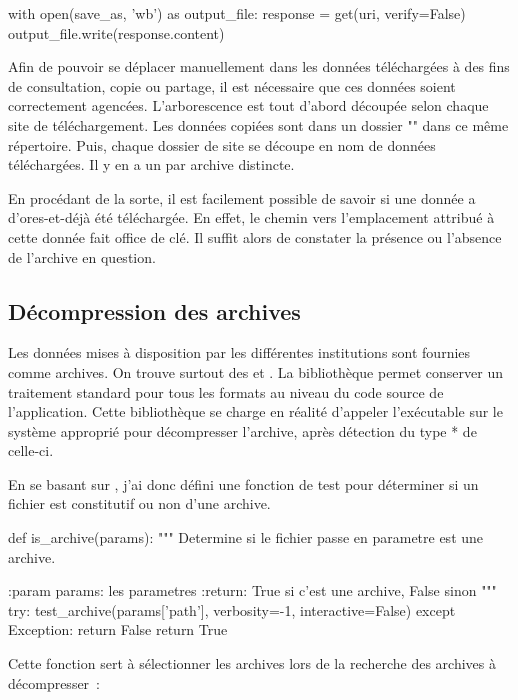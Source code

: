 \begin{Code}
  with open(save_as, 'wb') as output_file:
      response = get(uri, verify=False)
      output_file.write(response.content)
\end{Code}

Afin de pouvoir se déplacer manuellement dans les données téléchargées à des fins de consultation, copie ou partage, il est nécessaire que ces données soient correctement agencées. L'arborescence est tout d'abord découpée selon chaque site de téléchargement. Les données copiées sont dans un dossier "" dans ce même répertoire. Puis, chaque dossier de site se découpe en nom de données téléchargées. Il y en a un par archive distincte.

En procédant de la sorte, il est facilement possible de savoir si une donnée a d'ores-et-déjà été téléchargée. En effet, le chemin vers l'emplacement attribué à cette donnée fait office de clé. Il suffit alors de constater la présence ou l'absence de l'archive en question.

  \subsection{Décompression des archives}

Les données mises à disposition par les différentes institutions sont fournies comme archives. On trouve surtout des  et . La bibliothèque  permet conserver un traitement standard pour tous les formats au niveau du code source de l'application. Cette bibliothèque se charge en réalité d'appeler l'exécutable sur le système approprié pour décompresser l'archive, après détection du type * de celle-ci.

En se basant sur , j'ai donc défini une fonction de test pour déterminer si un fichier est constitutif ou non d'une archive.

\begin{Code}
  def is_archive(params):
      """
      Determine si le fichier passe en parametre est une archive.

      :param params: les parametres
      :return: True si c'est une archive, False sinon
      """
      try:
          test_archive(params['path'], verbosity=-1, interactive=False)
      except Exception:
          return False
      return True
\end{Code}

Cette fonction sert à sélectionner les archives lors de la recherche des archives à décompresser~:

